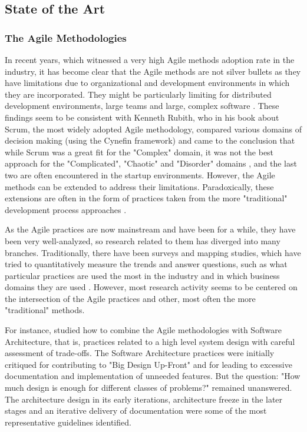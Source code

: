 \documentclass{article}
\begin{document}
\subsection{State of the Art}
\subsubsection{The Agile Methodologies}
In recent years, which witnessed a very high Agile methods adoption rate in the industry, it has become clear that the Agile methods are not silver bullets as they have limitations due to organizational and development environments in which they are incorporated. They might be particularly limiting for distributed development environments, large teams and large, complex software \citep{turk2014assumptions}. These findings seem to be consistent with Kenneth Rubith, who in his book about Scrum, the most widely adopted Agile methodology, compared various domains of decision making (using the Cynefin framework) and came to the conclusion that while Scrum was a great fit for the "Complex" domain, it was not the best approach for the "Complicated", "Chaotic" and "Disorder" domains \citep{rubin2012essential}, and the last two are often encountered in the startup environments. However, the Agile methods can be extended to address their limitations. Paradoxically, these extensions are often in the form of practices taken from the more "traditional" development process approaches \citep{turk2014limitations}.

As the Agile practices are now mainstream and have been for a while, they have been very well-analyzed, so research related to them has diverged into many branches. Traditionally, there have been surveys and mapping studies, which have tried to quantitatively measure the trends and answer questions, such as what particular practices are used the most in the industry and in which business domains they are used \citep{diebold2014Agile}. However, most research activity seems to be centered on the intersection of the Agile practices and other, most often the more "traditional" methods.

For instance, \cite{yang2016systematic} studied how to combine the Agile methodologies with Software Architecture, that is, practices related to a high level system design with careful assessment of trade-offs. The Software Architecture practices were initially critiqued for contributing to "Big Design Up-Front" and for leading to excessive documentation and implementation of unneeded features. But the question: "How much design is enough for different classes of problems?" remained unanswered. The architecture design in its early iterations, architecture freeze in the later stages and an iterative delivery of documentation were some of the most representative guidelines identified.
\end{document}
